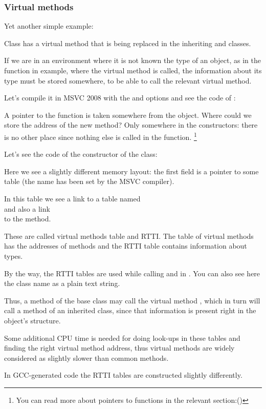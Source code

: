 \subsubsection{Virtual methods}

Yet another simple example:




Class  has a virtual method  that is being replaced in the inheriting  and  classes.


If we are in an environment where it is not known the type of an object, as in the \main function in example,
where the virtual method  is called, the information about its type must be stored somewhere, to
be able to call the relevant virtual method.


Let's compile it in MSVC 2008 with the \Ox and \Obzero options and see the code of \main:




A pointer to the  function is taken somewhere from the object.
Where could we store the address of the new method?
Only somewhere in the constructors: there is no other place since nothing else is called in the \main function.
\footnote{You can read more about pointers to functions in the relevant section:()}


Let's see the code of the constructor of the  class:




Here we see a slightly different memory layout:
the first field is a pointer to some table
 (the name has been set by the MSVC compiler).

\label{RTTI}

In this table we see a link to a table named \\
 and also a link\\
to the  method.

These are called virtual methods table and \ac{RTTI}.
The table of virtual methods has the addresses of methods and the \ac{RTTI} table contains information about types.

By the way, the \ac{RTTI} tables are used while calling  and  in \Cpp.
You can also see here the class name as a plain text string.

Thus, a method of the base  class may call the virtual method , which in turn will call
a method of an inherited class, since that information is present right in the object's structure.


Some additional CPU time is needed for doing look-ups in these tables and finding the right virtual method address, 
thus virtual methods are widely considered as slightly slower than common methods.


In GCC-generated code the \ac{RTTI} tables are constructed slightly differently.
